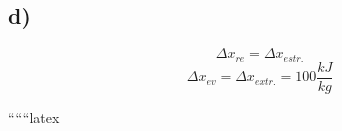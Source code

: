 

\subsection*{d)}
\[
\Delta x_{re} = \Delta x_{estr.}
\]
\[
\Delta x_{ev} = \Delta x_{extr.} = 100 \frac{kJ}{kg}
\]

``````latex